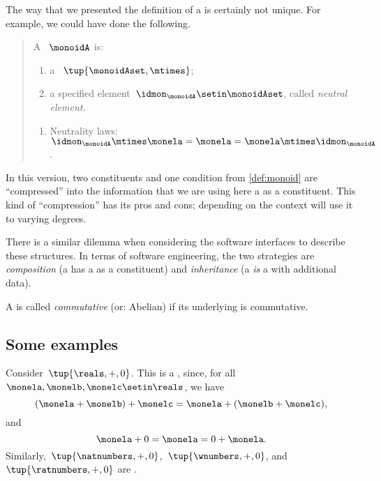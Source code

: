 \begin{remark}
    The way that we presented the definition of a  is certainly not unique.
    For example, we could have done the following.
    \begin{quote}
        A ~$\monoidA$ is:
        \begin{body}
            \constit
            \begin{enumerate}
                \item a ~$\tup{\monoidAset, \mtimes}$;
                \item a specified element~$\idmon_\monoidA \setin \monoidAset$, called \emph{neutral element}.
            \end{enumerate}
            \condit
            \begin{enumerate}
                \item Neutrality laws:~$\idmon_\monoidA \mtimes \monela= \monela= \monela \mtimes \idmon_\monoidA$.
            \end{enumerate}
        \end{body}
    \end{quote}
    In this version, two constituents and one condition from \cref{def:monoid} are ``compressed'' into the information that we are using here a  as a constituent.
    This kind of ``compression'' has its pros and cons; depending on the context will use it to varying degrees.

    There is a similar dilemma when considering the software interfaces to describe these structures.
    In terms of software engineering, the two strategies are \emph{composition} (a  has a  as a constituent) and \emph{inheritance} (a  \emph{is} a  with additional data).

\end{remark}

\begin{remark}
    A  is called \emph{commutative} (or: Abelian) if its underlying  is commutative.
\end{remark}

\subsection{Some examples}

\begin{example}
    Consider~$\tup{\reals,+,0}$.
    This is a , since, for all~$\monela,\monelb, \monelc \setin \reals$, we have
    \begin{equation}
        (\monela+\monelb)
        +\monelc=\monela+(\monelb+\monelc),
    \end{equation}
    and
    \begin{equation}
        \monela+0=\monela=0+\monela.
    \end{equation}
    Similarly,~$\tup{\natnumbers, +,0}$,~$\tup{\wnumbers, +,0}$, and~$\tup{\ratnumbers, +,0}$ are .
\end{example}

